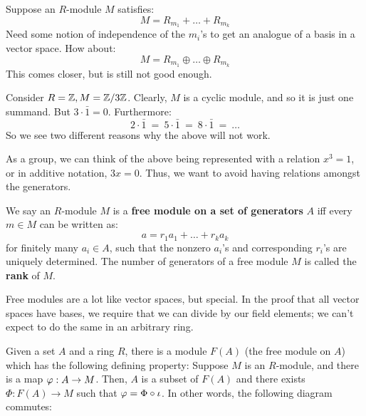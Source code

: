Suppose an $ R $-module $ M $ satisfies:
\begin{equation*}
    M = R_{m_{1}} + \dots + R_{m_{k}}
\end{equation*}
Need some notion of independence of the $ m_{i} $'s to get an analogue of a basis in a vector space.
How about:
\begin{equation*}
    M = R_{m_{1}} \oplus \dots \oplus R_{m_{k}}
\end{equation*}
This comes closer, but is still not good enough.
\begin{xmp}[source=Primary Source Material]
    Consider $ R = \mathbb{Z}, M = \mathbb{Z}/3\mathbb{Z} $. \vsp
    Clearly, $ M $ is a cyclic module, and so it is just one summand.
    But $ 3 \cdot \bar{1} = 0 $. Furthermore:
    \begin{equation*}
        2 \cdot \bar{1} \ = \ 5 \cdot \bar{1} \ = \ 8 \cdot \bar{1} \ = \ \dots
    \end{equation*}
    So we see two different reasons why the above will not work.
\end{xmp}
As a group, we can think of the above being represented with a relation $ x^{3} = 1 $, or in
additive notation, $ 3x = 0 $. Thus, we want to avoid having relations amongst the generators.

\begin{defn}
    We say an $ R $-module $ M $ is a \textbf{free module on a set of generators} $ A $ iff
    every $ m \in M $ can be written as:
    \begin{equation*}
        a = r_{1}a_{1} + \dots + r_{k}a_{k}
    \end{equation*}
    for finitely many $ a_{i} \in A $, such that the nonzero $ a_{i} $'s and corresponding
    $ r_{i} $'s are uniquely determined. \vsp
    The number of generators of a free module $ M $ is called the \textbf{rank} of $ M $.
\end{defn}
Free modules are a lot like vector spaces, but special.
In the proof that all vector spaces have bases, we require that we can divide by our field elements;
we can't expect to do the same in an arbitrary ring.

\begin{thm}
    Given a set $ A $ and a ring $ R $, there is a module $ F(A) $ (the free module on $ A $)
    which has the following defining property: \vsp
    Suppose $ M $ is an $ R $-module, and there is a map $ \operatorname{\varphi}:A \rightarrow M $.
    Then, $ A $ is a subset of $ F(A) $ and there exists $ \Phi: F(A) \rightarrow M $ such
    that $ \operatorname{\varphi} = \Phi \circ \iota $. In other words, the following diagram commutes:
    
    \centering
    \flushleft
    
\end{thm}

